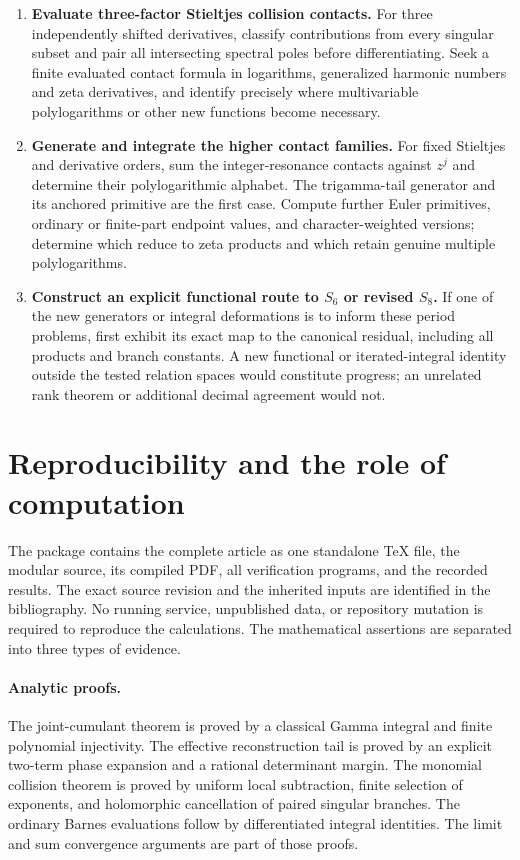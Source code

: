 \documentclass[11pt,a4paper]{article}
\numberwithin{equation}{section}
\theoremstyle{definition}
\theoremstyle{remark}
\begin{document}
\begin{enumerate}
\item \textbf{Evaluate three-factor Stieltjes collision contacts.}
For three independently shifted derivatives, classify contributions
from every singular subset and pair all intersecting spectral poles
before differentiating. Seek a finite evaluated contact formula in
logarithms, generalized harmonic numbers and zeta derivatives, and
identify precisely where multivariable polylogarithms or other new
functions become necessary.

\item \textbf{Generate and integrate the higher contact families.}
For fixed Stieltjes and derivative orders, sum the integer-resonance
contacts against $z^j$ and determine their polylogarithmic alphabet.
The trigamma-tail generator and its anchored primitive are the first
case. Compute further Euler primitives, ordinary or finite-part
endpoint values, and character-weighted versions; determine which
reduce to zeta products and which retain genuine multiple
polylogarithms.

\item \textbf{Construct an explicit functional route to $S_6$ or revised
$S_8$.}
If one of the new generators or integral deformations is to inform
these period problems, first exhibit its exact map to the canonical
residual, including all products and branch constants. A new
functional or iterated-integral identity outside the tested relation
spaces would constitute progress; an unrelated rank theorem or
additional decimal agreement would not.
\end{enumerate}


\section{Reproducibility and the role of computation}
\label{repro:section}

The package contains the complete article as one standalone TeX file,
the modular source, its compiled PDF, all verification programs, and
the recorded results. The exact source revision and the inherited
inputs are identified in the bibliography. No running service,
unpublished data, or repository mutation is required to reproduce the
calculations. The mathematical assertions are separated into three
types of evidence.

\paragraph{Analytic proofs.}
The joint-cumulant theorem is proved by a classical Gamma integral and
finite polynomial injectivity. The effective reconstruction tail is
proved by an explicit two-term phase expansion and a rational
determinant margin. The monomial collision theorem is proved by
uniform local subtraction, finite selection of exponents, and
holomorphic cancellation of paired singular branches. The ordinary
Barnes evaluations follow by differentiated integral identities.
The limit and sum convergence arguments are part of those proofs.
\end{document}
